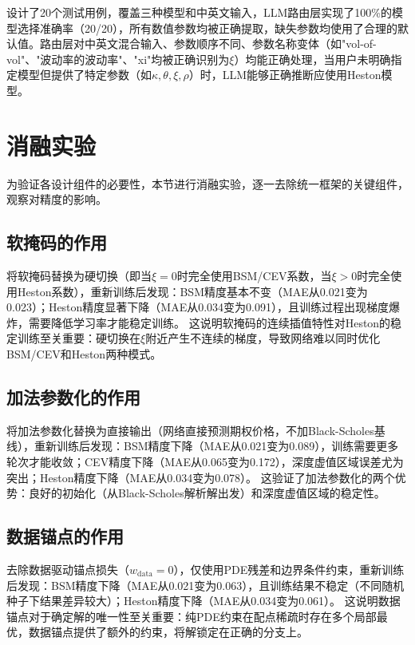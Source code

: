 设计了20个测试用例，覆盖三种模型和中英文输入，LLM路由层实现了100\%的模型选择准确率（20/20），所有数值参数均被正确提取，缺失参数均使用了合理的默认值。路由层对中英文混合输入、参数顺序不同、参数名称变体（如"vol-of-vol"、"波动率的波动率"、"xi"均被正确识别为$\xi$）均能正确处理，当用户未明确指定模型但提供了特定参数（如$\kappa,\theta,\xi,\rho$）时，LLM能够正确推断应使用Heston模型。

\section{消融实验}\label{sec:ablation}

为验证各设计组件的必要性，本节进行消融实验，逐一去除统一框架的关键组件，观察对精度的影响。

\subsection{软掩码的作用}

将软掩码替换为硬切换（即当$\xi=0$时完全使用BSM/CEV系数，当$\xi>0$时完全使用Heston系数），重新训练后发现：BSM精度基本不变（MAE从0.021变为0.023）；Heston精度显著下降（MAE从0.034变为0.091），且训练过程出现梯度爆炸，需要降低学习率才能稳定训练。
这说明软掩码的连续插值特性对Heston的稳定训练至关重要：硬切换在$\xi$附近产生不连续的梯度，导致网络难以同时优化BSM/CEV和Heston两种模式。

\subsection{加法参数化的作用}

将加法参数化替换为直接输出（网络直接预测期权价格，不加Black-Scholes基线），重新训练后发现：BSM精度下降（MAE从0.021变为0.089），训练需要更多轮次才能收敛；CEV精度下降（MAE从0.065变为0.172），深度虚值区域误差尤为突出；Heston精度下降（MAE从0.034变为0.078）。
这验证了加法参数化的两个优势：良好的初始化（从Black-Scholes解析解出发）和深度虚值区域的稳定性。

\subsection{数据锚点的作用}

去除数据驱动锚点损失（$w_\text{data}=0$），仅使用PDE残差和边界条件约束，重新训练后发现：BSM精度下降（MAE从0.021变为0.063），且训练结果不稳定（不同随机种子下结果差异较大）；Heston精度下降（MAE从0.034变为0.061）。
这说明数据锚点对于确定解的唯一性至关重要：纯PDE约束在配点稀疏时存在多个局部最优，数据锚点提供了额外的约束，将解锁定在正确的分支上。


